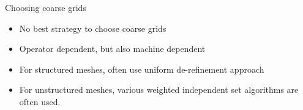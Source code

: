 




\begin{frame}{Choosing coarse grids}
  \begin{itemize}
  \item   No best strategy to choose coarse grids
  \item Operator dependent, but also machine dependent


\item For structured meshes, often use uniform de-refinement
approach
\item For unstructured meshes, various weighted independent set
algorithms are often used.

  \end{itemize}
\end{frame}

